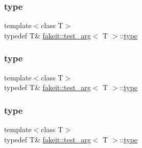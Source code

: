 \subsubsection{\texorpdfstring{type}{type}\hspace{0.1cm}{\footnotesize\ttfamily [1/9]}}
{\footnotesize\ttfamily template$<$class T$>$ \\
typedef T\& \mbox{\hyperlink{structfakeit_1_1test__arg}{fakeit\+::test\+\_\+arg}}$<$ T $>$\+::\mbox{\hyperlink{structfakeit_1_1test__arg_a100a8f745c77f37aad942184679a0399}{type}}}

\mbox{\label{structfakeit_1_1test__arg_a100a8f745c77f37aad942184679a0399}} 
\subsubsection{\texorpdfstring{type}{type}\hspace{0.1cm}{\footnotesize\ttfamily [2/9]}}
{\footnotesize\ttfamily template$<$class T$>$ \\
typedef T\& \mbox{\hyperlink{structfakeit_1_1test__arg}{fakeit\+::test\+\_\+arg}}$<$ T $>$\+::\mbox{\hyperlink{structfakeit_1_1test__arg_a100a8f745c77f37aad942184679a0399}{type}}}

\mbox{\label{structfakeit_1_1test__arg_a100a8f745c77f37aad942184679a0399}} 
\subsubsection{\texorpdfstring{type}{type}\hspace{0.1cm}{\footnotesize\ttfamily [3/9]}}
{\footnotesize\ttfamily template$<$class T$>$ \\
typedef T\& \mbox{\hyperlink{structfakeit_1_1test__arg}{fakeit\+::test\+\_\+arg}}$<$ T $>$\+::\mbox{\hyperlink{structfakeit_1_1test__arg_a100a8f745c77f37aad942184679a0399}{type}}}

\mbox{\label{structfakeit_1_1test__arg_a100a8f745c77f37aad942184679a0399}} 
